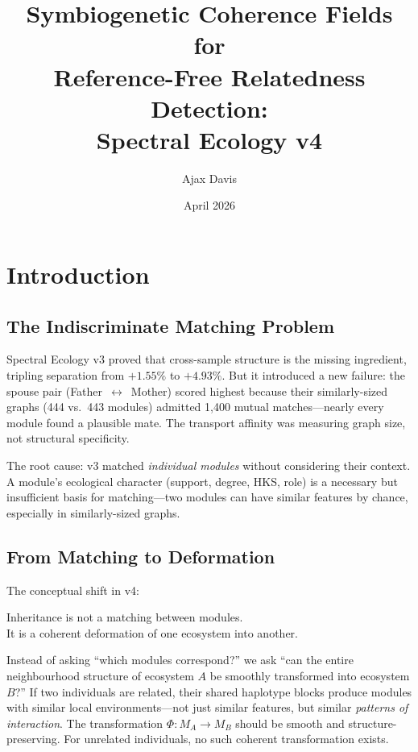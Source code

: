 \documentclass{../yalumba}
\title{Symbiogenetic Coherence Fields for\\Reference-Free Relatedness Detection:\\Spectral Ecology v4}
\author{Ajax Davis}
\date{April 2026}
\begin{document}
\maketitle

\tableofcontents
\newpage


\section{Introduction}
\label{sec:intro}

\subsection{The Indiscriminate Matching Problem}

Spectral Ecology v3 proved that cross-sample structure is the missing
ingredient, tripling separation from $+1.55\%$ to $+4.93\%$.  But it
introduced a new failure: the spouse pair (Father~$\leftrightarrow$~Mother)
scored highest because their similarly-sized graphs (444 vs.\ 443 modules)
admitted 1{,}400 mutual matches---nearly every module found a plausible mate.
The transport affinity was measuring graph size, not structural specificity.


The root cause: v3 matched \emph{individual modules} without considering
their context.  A module's ecological character (support, degree, HKS, role)
is a necessary but insufficient basis for matching---two modules can have
similar features by chance, especially in similarly-sized graphs.

\subsection{From Matching to Deformation}

The conceptual shift in v4:

\begin{pullquote}
Inheritance is not a matching between modules.\\
It is a coherent deformation of one ecosystem into another.
\end{pullquote}

Instead of asking ``which modules correspond?'' we ask ``can the entire
neighbourhood structure of ecosystem $A$ be smoothly transformed into
ecosystem $B$?''  If two individuals are related, their shared haplotype
blocks produce modules with similar local environments---not just similar
features, but similar \emph{patterns of interaction}.  The transformation
$\Phi: M_A \to M_B$ should be smooth and structure-preserving.  For unrelated
individuals, no such coherent transformation exists.
\end{document}
